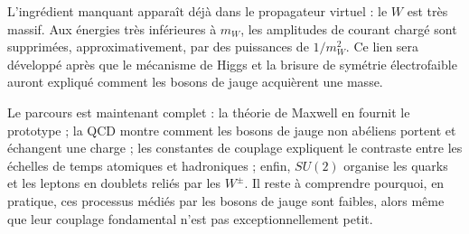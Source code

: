 L’ingrédient manquant apparaît déjà dans le propagateur virtuel : le \(W\) est très massif. Aux énergies très inférieures à \(m_W\), les amplitudes de courant chargé sont supprimées, approximativement, par des puissances de \(1/m_W^2\). Ce lien sera développé après que le mécanisme de Higgs et la brisure de symétrie électrofaible auront expliqué comment les bosons de jauge acquièrent une masse.

\begin{classroomqa}
\end{classroomqa}

Le parcours est maintenant complet : la théorie de Maxwell en fournit le prototype ; la QCD montre comment les bosons de jauge non abéliens portent et échangent une charge ; les constantes de couplage expliquent le contraste entre les échelles de temps atomiques et hadroniques ; enfin, \(SU(2)\) organise les quarks et les leptons en doublets reliés par les \(W^\pm\). Il reste à comprendre pourquoi, en pratique, ces processus médiés par les bosons de jauge sont faibles, alors même que leur couplage fondamental n’est pas exceptionnellement petit.
